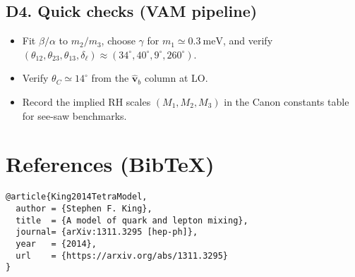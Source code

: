 \documentclass[11pt]{article}
\begin{document}
  \subsection*{D4. Quick checks (VAM pipeline)}
      \begin{itemize}
      \item Fit $\beta/\alpha$ to $m_2/m_3$, choose $\gamma$ for $m_1\simeq0.3~\mathrm{meV}$, and verify
      $(\theta_{12},\theta_{23},\theta_{13},\delta_\ell)\approx(34^\circ,40^\circ,9^\circ,260^\circ)$.
      \item Verify $\theta_C\simeq 14^\circ$ from the $\hat{\mathbf v}_b$ column at LO.
      \item Record the implied RH scales $(M_1,M_2,M_3)$ in the Canon constants table for see-saw benchmarks.
      \end{itemize}

  \section*{References (Bib\TeX)}
  \begin{verbatim}
@article{King2014TetraModel,
  author = {Stephen F. King},
  title  = {A model of quark and lepton mixing},
  journal= {arXiv:1311.3295 [hep-ph]},
  year   = {2014},
  url    = {https://arxiv.org/abs/1311.3295}
}
  \end{verbatim}




  \ifdefined\standalonechapter\else
  
\end{document}
